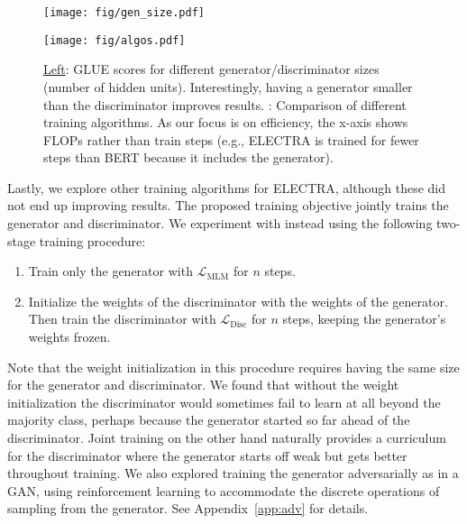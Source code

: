 \documentclass{article}
\newcommand{\xhdr}[1]{\vspace{0mm}\noindent{{\bf #1}}\hspace{1.3mm}}
\newcommand{\lossgs}{\mathcal{L}_\text{MLM}}
\newcommand{\lossds}{\mathcal{L}_\text{Disc}}
\begin{document}
\begin{figure}[tb]
\begin{center}
\begin{minipage}[c]{0.55\textwidth}
\texttt{[image: fig/gen\_size.pdf]}
\end{minipage}
\hspace{4mm}
\begin{minipage}[c]{0.4\textwidth}
\texttt{[image: fig/algos.pdf]}
\end{minipage}
\end{center}
\caption{\underline{Left}: GLUE scores for different generator/discriminator sizes (number of hidden units). Interestingly, having a generator smaller than the discriminator improves results.
\underline{}: Comparison of different training algorithms. As our focus is on efficiency, the x-axis shows FLOPs rather than train steps (e.g., ELECTRA is trained for fewer steps than BERT because it includes the generator).}
\label{fig:extensions}
\end{figure}


\xhdr{Training Algorithms}
Lastly, we explore other training algorithms for ELECTRA, although these did not end up improving results.
The proposed training objective jointly trains the generator and discriminator. We experiment with instead using the following two-stage training procedure:
\begin{enumerate}
    \vspace{-1mm}
    \item Train only the generator with $\lossgs$ for $n$ steps.
    \vspace{-0.3mm}
    \item Initialize the weights of the discriminator with the weights of the generator. Then train the discriminator with $\lossds$ for $n$ steps, keeping the generator's weights frozen.
    \vspace{-1mm}
\end{enumerate}
Note that the weight initialization in this procedure requires having the same size for the generator and discriminator.
We found that without the weight initialization the discriminator would sometimes fail to learn at all beyond the majority class, perhaps because the generator started so far ahead of the discriminator. 
Joint training on the other hand naturally provides a curriculum for the discriminator where the generator starts off weak but gets better throughout training.
We also explored training the generator adversarially as in a GAN, using reinforcement learning to accommodate the discrete operations of sampling from the generator. See Appendix~\ref{app:adv} for details. 
\end{document}
